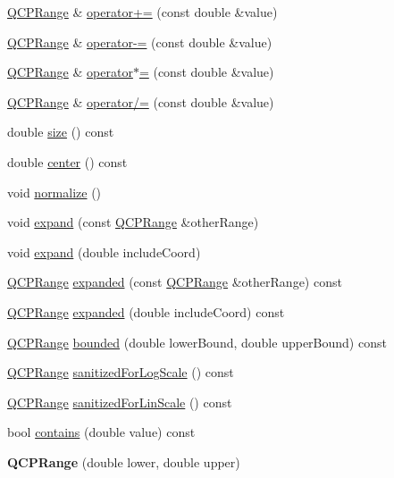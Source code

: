 \begin{DoxyCompactItemize}
\item 
\hyperlink{class_q_c_p_range}{Q\+C\+P\+Range} \& \hyperlink{class_q_c_p_range_afea7c1aa7d08f061cd9bd8832f957df8}{operator+=} (const double \&value)
\item 
\hyperlink{class_q_c_p_range}{Q\+C\+P\+Range} \& \hyperlink{class_q_c_p_range_a95894bcb15a16a75ca564091374e2191}{operator-\/=} (const double \&value)
\item 
\hyperlink{class_q_c_p_range}{Q\+C\+P\+Range} \& \hyperlink{class_q_c_p_range_a6876aa9620ff2f0f7f1873f998372cef}{operator$\ast$=} (const double \&value)
\item 
\hyperlink{class_q_c_p_range}{Q\+C\+P\+Range} \& \hyperlink{class_q_c_p_range_a6137d8682b6835ace840730b4c1e2d63}{operator/=} (const double \&value)
\item 
double \hyperlink{class_q_c_p_range_afa57c13049b965edb6fd1c00ac56338a}{size} () const 
\item 
double \hyperlink{class_q_c_p_range_a3825b53cf17da5de0843c1f3baad07db}{center} () const 
\item 
void \hyperlink{class_q_c_p_range_af914a7740269b0604d0827c634a878a9}{normalize} ()
\item 
void \hyperlink{class_q_c_p_range_a0fa1bc8048be50d52bea93a8caf08305}{expand} (const \hyperlink{class_q_c_p_range}{Q\+C\+P\+Range} \&other\+Range)
\item 
void \hyperlink{class_q_c_p_range_a5fa977db0a4b7800075c629c62cf5e80}{expand} (double include\+Coord)
\item 
\hyperlink{class_q_c_p_range}{Q\+C\+P\+Range} \hyperlink{class_q_c_p_range_a6437bdf29a7ebc2c88a6045c4e622384}{expanded} (const \hyperlink{class_q_c_p_range}{Q\+C\+P\+Range} \&other\+Range) const 
\item 
\hyperlink{class_q_c_p_range}{Q\+C\+P\+Range} \hyperlink{class_q_c_p_range_a932046218e2b8b93b4be0a1d270b63c2}{expanded} (double include\+Coord) const 
\item 
\hyperlink{class_q_c_p_range}{Q\+C\+P\+Range} \hyperlink{class_q_c_p_range_a7ad9b4f4f53bd28c98b183d750abaddf}{bounded} (double lower\+Bound, double upper\+Bound) const 
\item 
\hyperlink{class_q_c_p_range}{Q\+C\+P\+Range} \hyperlink{class_q_c_p_range_aaf6a9046e78d91eeb8e89584fe46b034}{sanitized\+For\+Log\+Scale} () const 
\item 
\hyperlink{class_q_c_p_range}{Q\+C\+P\+Range} \hyperlink{class_q_c_p_range_a1ff029704c29a75adbc1dc36cecaf44c}{sanitized\+For\+Lin\+Scale} () const 
\item 
bool \hyperlink{class_q_c_p_range_a030ce95b527c32e01414d0351347b46d}{contains} (double value) const 
\item 
{\bfseries Q\+C\+P\+Range} (double lower, double upper)\hypertarget{class_q_c_p_range_a1d9d84d084c8f368fdedd42e0978d405}{}\label{class_q_c_p_range_a1d9d84d084c8f368fdedd42e0978d405}


\end{DoxyCompactItemize}
